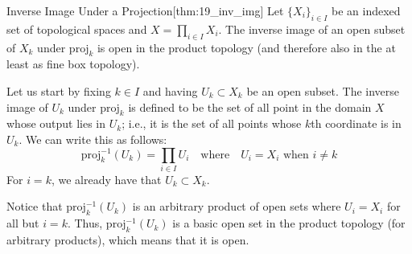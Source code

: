 \begin{thmBox}{Inverse Image Under a Projection}[thm:19_inv_img]
    Let \( \{ X_{ i } \}_{ i \in I } \) be an indexed set of topological spaces
    and \( X = \prod_{ i \in I } X_{ i } \).
    The inverse image of an open subset of \( X_{ k } \) under 
    \( \mathrm{proj}_{ k } \) is open in the product topology (and therefore
    also in the at least as fine box topology).

    \baseRule

    \begin{proofBox}
        Let us start by fixing \( k \in I \) and having \( U_{ k } \subset 
        X_{ k } \) be an open subset.
        The inverse image of \( U_{ k } \) under \( \mathrm{proj}_{ k } \)
        is defined to be the set of all point in the domain \( X \) whose 
        output lies in \( U_{ k } \); i.e., it is the set of all points 
        whose \( k \)th coordinate is in \( U_{ k } \).
        We can write this as follows:
        \begin{equation*}
            \mathrm{proj}_{ k }^{ -1 } ( U_{ k } )
            =
            \prod_{ i \in I } U_{ i }
            \quad \mathrm{where} \quad 
            U_{ i } = X_{ i }
            \text{ when }
            i \neq k    
        \end{equation*}
        For \( i = k \), we already have that \( U_{ k } \subset X_{ k } \).

        \baseSkip

        Notice that \( \mathrm{proj}_{ k }^{ -1 } ( U_{ k } ) \) is an arbitrary
        product of open sets where \( U_{ i } = X_{ i } \) for all but 
        \( i = k \). 
        Thus, \( \mathrm{proj}_{ k }^{ -1 } ( U_{ k } ) \) is a basic open set
        in the product topology (for arbitrary products), which means that it 
        is open.
    \end{proofBox}
\end{thmBox}

